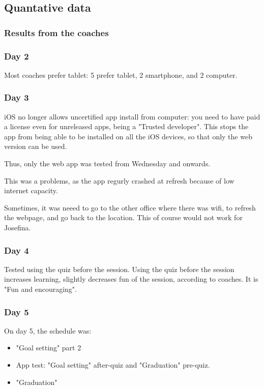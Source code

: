 \subsection{Quantative data}


    \subsubsection{Results from the coaches}

    \subsubsection{Day 2}
    Most coaches prefer tablet: 5 prefer tablet, 2 smartphone, and 2 computer.

    \subsubsection{Day 3}
    iOS no longer allows uncertified app install from computer: you need to have paid a license even for unreleased apps, being a "Trusted developer". This stops the app from being able to be installed on all the iOS devices, so that only the web version can be used.

    Thus, only the web app was tested from Wednesday and onwards.

    This was a problems, as the app regurly crashed at refresh because of low internet capacity.

    Sometimes, it was neeed to go to the other office where there was wifi, to refresh the webpage, and go back to the location. This of course would not work for Josefina.

    \subsubsection{Day 4}
    Tested using the quiz before the session.  Using the quiz before the session increases learning, slightly decreases fun of the session, according to coaches. It is "Fun and encouraging".

    \subsubsection{Day 5}
    On day 5, the schedule was:

    \begin{itemize}
      \item "Goal setting" part 2
      \item App test: "Goal setting" after-quiz and "Graduation" pre-quiz.
      \item "Graduation"
    \end{itemize}

